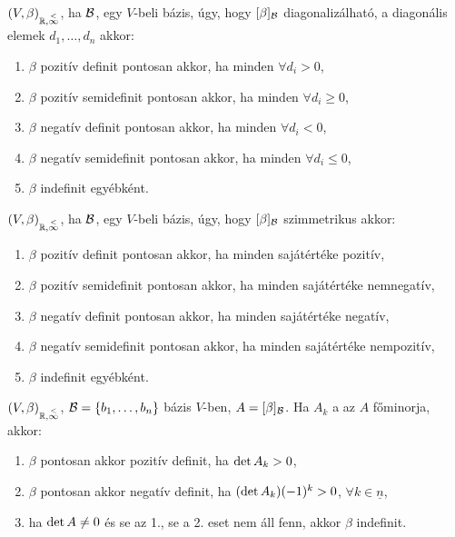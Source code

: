 \begin{all}
	$(V,\beta)_{\mathbb{R},\overset{<}{\infty}}$, ha $\mathcal{B}$, egy $V$-beli bázis, úgy, hogy $[\beta]_{\mathcal{B}}$ 
	diagonalizálható, a diagonális elemek $d_1,\dots,d_n$ akkor:
	\begin{enumerate}
		\item $\beta$ pozitív definit pontosan akkor, ha minden $\forall
			d_i>0$,
		\item $\beta$ pozitív semidefinit pontosan akkor, ha minden
			$\forall d_i\geq 0$,
		\item $\beta$ negatív definit pontosan akkor, ha minden $\forall d_i<0$,
		\item $\beta$ negatív semidefinit pontosan akkor, ha minden
			$\forall d_i\leq 0$,
		\item $\beta$ indefinit egyébként.
	\end{enumerate}
\end{all}
\begin{all}
	$(V,\beta)_{\mathbb{R},\overset{<}{\infty}}$, ha $\mathcal{B}$, egy $V$-beli bázis, úgy, hogy $[\beta]_{\mathcal{B}}$ 
	szimmetrikus akkor:
	\begin{enumerate}
		\item $\beta$ pozitív definit pontosan akkor, ha minden sajátértéke
			pozitív,
		\item $\beta$ pozitív semidefinit pontosan akkor, ha minden
			sajátértéke nemnegatív,
		\item $\beta$ negatív definit pontosan akkor, ha minden sajátértéke
			negatív,
		\item $\beta$ negatív semidefinit pontosan akkor, ha minden
			sajátértéke nempozitív,
		\item $\beta$ indefinit egyébként.
	\end{enumerate}
\end{all}

\begin{all}
	$(V,\beta)_{\mathbb{R},\overset{<}{\infty}}$, $\mathcal{B}=\{b_1,\ldots,b_n\}$ bázis $V$-ben,
	$A=[\beta]_{\mathcal{B}}$. Ha $A_k$ a az $A$ főminorja, akkor:
	\begin{enumerate}
	\item $\beta$ pontosan akkor pozitív definit, ha $\operatorname{det}{A_k}>0$,
	\item $\beta$ pontosan akkor negatív definit, ha $(\operatorname{det}{A_k})(-1)^k>0$,
		$\forall k\in\underline{n}$,
	\item ha $\operatorname{det}{A}\neq 0$ és se az 1., se a 2. eset nem áll fenn, akkor
		$\beta$ indefinit.
	\end{enumerate}
\end{all}

